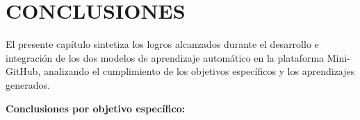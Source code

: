 %
%
\newpage
{}

%
%

\section*{CONCLUSIONES}

El presente capítulo sintetiza los logros alcanzados durante el desarrollo e integración de los dos modelos de aprendizaje automático en la plataforma Mini-GitHub, analizando el cumplimiento de los objetivos específicos y los aprendizajes generados.

\vspace{0.5em}

\textbf{Conclusiones por objetivo específico:}

